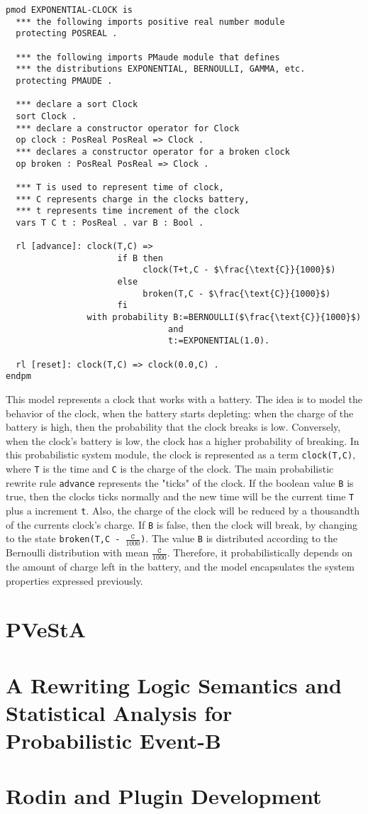 \begin{lstlisting}[mathescape=true]
pmod EXPONENTIAL-CLOCK is
  *** the following imports positive real number module
  protecting POSREAL .

  *** the following imports PMaude module that defines 
  *** the distributions EXPONENTIAL, BERNOULLI, GAMMA, etc.
  protecting PMAUDE .

  *** declare a sort Clock
  sort Clock .
  *** declare a constructor operator for Clock
  op clock : PosReal PosReal => Clock .
  *** declares a constructor operator for a broken clock
  op broken : PosReal PosReal => Clock .

  *** T is used to represent time of clock,
  *** C represents charge in the clocks battery,
  *** t represents time increment of the clock
  vars T C t : PosReal . var B : Bool .
  
  rl [advance]: clock(T,C) =>
                      if B then
                           clock(T+t,C - $\frac{\text{C}}{1000}$)
                      else
                           broken(T,C - $\frac{\text{C}}{1000}$)
                      fi
                with probability B:=BERNOULLI($\frac{\text{C}}{1000}$) 
                                and 
                                t:=EXPONENTIAL(1.0).
                
  rl [reset]: clock(T,C) => clock(0.0,C) .
endpm
\end{lstlisting}
This model represents a clock that works with a battery. The idea is to model the behavior of the clock, when the battery starts depleting: when the charge of the battery is high, then the probability that the clock breaks is low. Conversely, when the clock's battery is low, the clock has a higher probability of breaking. In this probabilistic system module, the clock is represented as a term \texttt{clock(T,C)}, where \texttt{T} is the time and \texttt{C} is the charge of the clock. The main probabilistic rewrite rule \texttt{advance} represents the "ticks" of the clock. If the boolean value \texttt{B} is true, then the clocks ticks normally and the new time will be the current time \texttt{T} plus a increment \texttt{t}. Also, the charge of the clock will be reduced by a thousandth of the currents clock's charge. If \texttt{B} is false, then the clock will break, by changing to the state \texttt{broken(T,C - $\frac{\texttt{C}}{1000}$)}. The value \texttt{B} is distributed according to the Bernoulli distribution with mean $\frac{\texttt{C}}{1000}$. Therefore, it probabilistically depends on the amount of charge left in the battery, and the model encapsulates the system properties expressed previously.     

\section{PVeStA}

\section{A Rewriting Logic Semantics and Statistical Analysis for Probabilistic Event-B}

\section{Rodin and Plugin Development}










